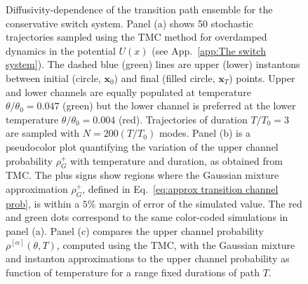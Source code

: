 \begin{figure}
    \caption[  ]
    {\small Diffusivity-dependence of the transition path ensemble for the conservative
switch system. Panel (a) shows 50 stochastic trajectories sampled using
the TMC method for overdamped dynamics in the potential
$U(x)$ (see App.~\ref{app:The switch system}). The dashed blue (green) lines are upper
(lower) instantons between initial (circle, $\mathbf{x}_{0}$) and
final (filled circle, $\mathbf{x}_{T}$) points. Upper and lower channels
are equally populated at temperature $\theta/\theta_{0}=0.047$ (green)
but the lower channel is preferred at the lower temperature $\theta/\theta_{0}=0.004$
(red). Trajectories of duration $T/T_{0}=3$ are sampled with $N=200(T/T_{0})$
modes. Panel (b) is a pseudocolor plot quantifying the variation of
the upper channel probability $\rho_{G}^{+}$ with temperature and duration,
as obtained from TMC. The plus signs show regions where the Gaussian
mixture approximation $\rho_{G}^{+}$, defined in Eq.~\ref{eq:approx transition channel prob}, is within
a $5\%$ margin of error of the simulated value. The red and green
dots correspond to the same color-coded simulations in panel (a).
Panel (c) compares the upper channel probability $\rho^{[\alpha]}(\theta,T)$, computed using the TMC, with the Gaussian mixture and
instanton approximations to the upper channel probability as function
of temperature for a range fixed durations of path $T$.} 
\end{figure} 

